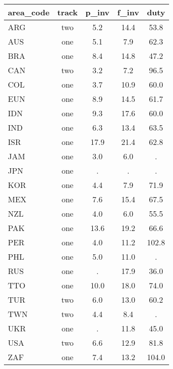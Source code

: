 \documentclass[]{article}
\begin{document}
\begin{tabular}{lcccc} \hline
area\_code & track & p\_inv & f\_inv & duty \\ \hline
ARG & two & 5.2 & 14.4 & 53.8 \\
AUS & one & 5.1 & 7.9 & 62.3 \\
BRA & one & 8.4 & 14.8 & 47.2 \\
CAN & two & 3.2 & 7.2 & 96.5 \\
COL & one & 3.7 & 10.9 & 60.0 \\
EUN & one & 8.9 & 14.5 & 61.7 \\
IDN & one & 9.3 & 17.6 & 60.0 \\
IND & one & 6.3 & 13.4 & 63.5 \\
ISR & one & 17.9 & 21.4 & 62.8 \\
JAM & one & 3.0 & 6.0 & . \\
JPN & one & . & . & . \\
KOR & one & 4.4 & 7.9 & 71.9 \\
MEX & one & 7.6 & 15.4 & 67.5 \\
NZL & one & 4.0 & 6.0 & 55.5 \\
PAK & one & 13.6 & 19.2 & 66.6 \\
PER & one & 4.0 & 11.2 & 102.8 \\
PHL & one & 5.0 & 11.0 & . \\
RUS & one & . & 17.9 & 36.0 \\
TTO & one & 10.0 & 18.0 & 74.0 \\
TUR & two & 6.0 & 13.0 & 60.2 \\
TWN & two & 4.4 & 8.4 & . \\
UKR & one & . & 11.8 & 45.0 \\
USA & two & 6.6 & 12.9 & 81.8 \\
 ZAF & one & 7.4 & 13.2 & 104.0 \\ \hline
\end{tabular}
\end{document}
